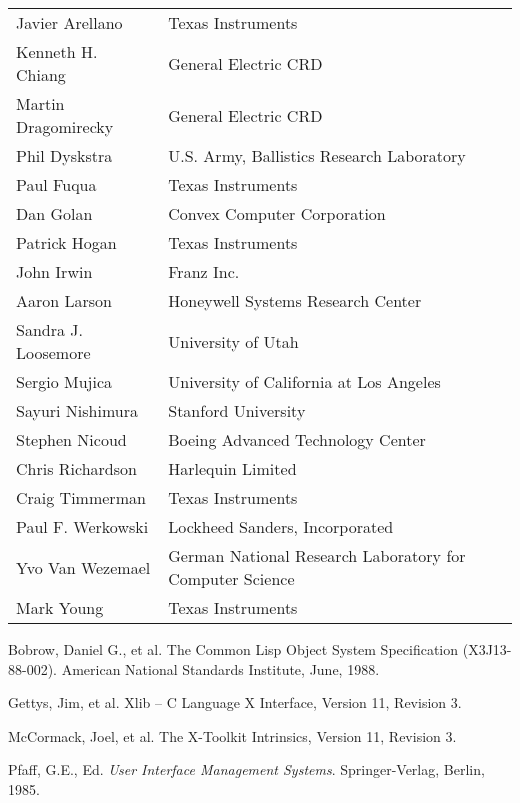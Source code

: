 \documentclass[twoside]{book}
\begin{document}
\begin{sloppy}
\begin{tabular}{ll}
Javier Arellano          & Texas Instruments \\
Kenneth H. Chiang        & General Electric CRD\\
Martin Dragomirecky      & General Electric CRD\\
Phil Dyskstra            & U.S. Army, Ballistics Research Laboratory \\
Paul Fuqua               & Texas Instruments \\
Dan Golan                & Convex Computer Corporation \\
Patrick Hogan            & Texas Instruments \\
John Irwin               & Franz Inc.\\
Aaron Larson             & Honeywell Systems Research Center\\
Sandra J. Loosemore      & University of Utah \\
Sergio Mujica            & University of California at Los Angeles \\
Sayuri Nishimura         & Stanford University \\
Stephen Nicoud           & Boeing Advanced Technology Center\\
Chris Richardson         & Harlequin Limited \\
Craig Timmerman          & Texas Instruments \\
Paul F. Werkowski        & Lockheed Sanders, Incorporated \\
Yvo Van Wezemael         & German National Research Laboratory for Computer Science\\ 
Mark Young               & Texas Instruments \\
\end{tabular}


%
%
%
%
%
%
%
%
\begin{thebibliography}{9}

 Bobrow, Daniel G., et al. The Common Lisp Object System
Specification (X3J13-88-002). American National Standards Institute, June,
1988.

 Gettys, Jim, et al. Xlib -- C Language X Interface, Version
11, Revision 3.

 McCormack, Joel, et al. The X-Toolkit Intrinsics, Version
11, Revision 3.

 Pfaff, G.E., Ed. {\em User Interface Management Systems}.
Springer-Verlag, Berlin, 1985.


\end{thebibliography}
\end{sloppy}
\end{document}
